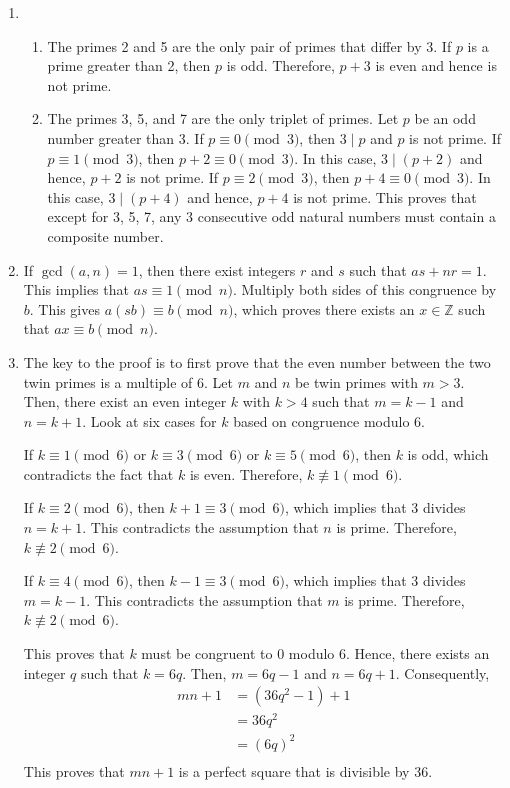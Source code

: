 \begin{enumerate}
\item \begin{enumerate}
\item The primes 2 and 5 are the only pair of primes that differ by 3.  If $p$ is a prime greater than 2, then $p$ is odd.  Therefore, $p + 3$ is even and hence is not prime.

\item The primes 3, 5, and 7 are the only triplet of primes.  Let $p$ be an odd number greater than 3.  If $p \equiv 0 \pmod 3$, then $3 \mid p$ and $p$ is not prime.  If $p \equiv 1 \pmod 3$, then $p + 2 \equiv 0 \pmod 3$.  In this case, $3 \mid \left( p + 2 \right)$ and hence, $p + 2$ is not prime.  If $p \equiv 2 \pmod 3$, then $p + 4 \equiv 0 \pmod 3$.  In this case, 
$3 \mid \left( p + 4 \right)$ and hence, $p + 4$ is not prime.  This proves that except for 3, 5, 7, any 3 consecutive odd natural numbers must contain a composite number.
\end{enumerate}

\item If $\gcd \left( a, n \right) = 1$, then there exist integers $r$ and $s$ such that 
$as + nr = 1$.  This implies that $as \equiv 1 \pmod n$.  Multiply both sides of this congruence by $b$.  This gives $a \left( sb \right) \equiv b \pmod n$, which proves there exists an 
$x \in \mathbb{Z}$ such that $ax \equiv b \pmod n$.

\item The key to the proof is to first prove that the even number between the two twin primes is a multiple of 6.  Let $m$ and $n$ be twin primes with $m > 3$.  Then, there exist an even integer 
$k$ with $k >4$ such that $m = k - 1$ and $n = k + 1$.  Look at six cases for $k$ based on congruence modulo 6.

If $k \equiv 1 \pmod 6$ or  $k \equiv 3 \pmod 6$ or $k \equiv 5 \pmod 6$, then $k$ is odd, which contradicts the fact that $k$ is even.  Therefore, $k \not \equiv 1 \pmod 6$.

If $k \equiv 2 \pmod 6$, then $k + 1 \equiv 3 \pmod 6$, which implies that 3 divides $n = k + 1$.  This contradicts the assumption that $n$ is prime.  Therefore, $k \not \equiv 2 \pmod 6$.

If $k \equiv 4 \pmod 6$, then $k - 1 \equiv 3 \pmod 6$, which implies that 3 divides $m = k - 1$.  This contradicts the assumption that $m$ is prime.  Therefore, $k \not \equiv 2 \pmod 6$.

This proves that $k$ must be congruent to 0 modulo 6. Hence, there exists an integer $q$ such that 
$k = 6q$.  Then, $m = 6q - 1$ and $n = 6q + 1$.  Consequently,
\[
\begin{aligned}
mn + 1 &= \left( 36q^2 -1 \right) + 1 \\
       &= 36q^2 \\
       &= \left( 6q \right)^2 \\
\end{aligned}
\]
This proves that $mn + 1$ is a perfect square that is divisible by 36.
\end{enumerate}




